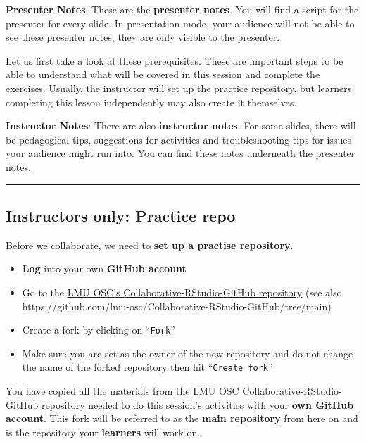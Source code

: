 \documentclass[
  letterpaper,
  DIV=11,
  numbers=noendperiod]{scrartcl}
\providecommand{\tightlist}{%
  \setlength{\itemsep}{0pt}\setlength{\parskip}{0pt}}
\begin{document}
\textbf{Presenter Notes}: These are the \textbf{presenter notes}. You
will find a script for the presenter for every slide. In presentation
mode, your audience will not be able to see these presenter notes, they
are only visible to the presenter.

Let us first take a look at these prerequisites. These are important
steps to be able to understand what will be covered in this session and
complete the exercises. Usually, the instructor will set up the practice
repository, but learners completing this lesson independently may also
create it themselves.

\textbf{Instructor Notes}: There are also \textbf{instructor notes}. For
some slides, there will be pedagogical tips, suggestions for activities
and troubleshooting tips for issues your audience might run into. You
can find these notes underneath the presenter notes.

\begin{center}\rule{0.5\linewidth}{0.5pt}\end{center}

\subsection{Instructors only: Practice
repo}\label{instructors-only-practice-repo}

Before we collaborate, we need to \textbf{set up a practise repository}.

\begin{itemize}
\tightlist
\item
  \textbf{Log} into your own \textbf{GitHub account}
\item
  Go to the
  \href{https://github.com/lmu-osc/Collaborative-RStudio-GitHub/tree/main}{LMU
  OSC's Collaborative-RStudio-GitHub repository} (see also
  https://github.com/lmu-osc/Collaborative-RStudio-GitHub/tree/main)
\item
  Create a fork by clicking on ``\texttt{Fork}''
\item
  Make sure you are set as the owner of the new repository and do not
  change the name of the forked repository then hit
  ``\texttt{Create\ fork}''
\end{itemize}

\begin{tcolorbox}[enhanced jigsaw, arc=.35mm, bottomrule=.15mm, bottomtitle=1mm, breakable, colback=white, colbacktitle=quarto-callout-important-color!10!white, colframe=quarto-callout-important-color-frame, coltitle=black, left=2mm, leftrule=.75mm, opacityback=0, opacitybacktitle=0.6, rightrule=.15mm, title=\textcolor{quarto-callout-important-color}{\faExclamation}\hspace{0.5em}{Now you have your practice repository!}, titlerule=0mm, toprule=.15mm, toptitle=1mm]

You have copied all the materials from the LMU OSC
Collaborative-RStudio-GitHub repository needed to do this session's
activities with your \textbf{own GitHub account}. This fork will be
referred to as the \textbf{main repository} from here on and is the
repository your \textbf{learners} will work on.

\end{tcolorbox}
\end{document}
